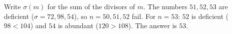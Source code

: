 Write $\sigma(m)$ for the sum of the divisors of $m$. The numbers $51,52,53$ are deficient ($\sigma=72,98,54$), so $n=50,51,52$ fail. For $n=53$: $52$ is deficient ($98<104$) and $54$ is abundant ($120>108$). The answer is $\boxed{53}$.
